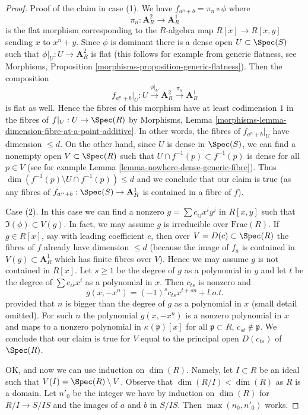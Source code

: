 \begin{proof}
\medskip\noindent
Proof of the claim in case (1). We have $f_{a^n + b} = \pi_n \circ \phi$
where
$$
\pi_n :  \mathbf{A}^2_R \to \mathbf{A}^1_R
$$
is the flat morphism corresponding to the $R$-algebra map $R[x] \to R[x, y]$
sending $x$ to $x^n + y$. Since $\phi$ is dominant there is a dense open
$U \subset \Spec(S)$ such that $\phi|_U : U \to \mathbf{A}^2_R$ is flat
(this follows for example from generic flatness, see
Morphisms, Proposition \ref{morphisms-proposition-generic-flatness}).
Then the composition
$$
f_{a^n + b}|_U :
U \xrightarrow{\phi|_U}
\mathbf{A}^2_R
\xrightarrow{\pi_n}
\mathbf{A}^1_R
$$
is flat as well. Hence the fibres of this morphism have at least
codimension $1$ in the fibres of $f|_U : U \to \Spec(R)$ by
Morphisms, Lemma \ref{morphisms-lemma-dimension-fibre-at-a-point-additive}.
In other words, the fibres of $f_{a^n + b}|_U$ have dimension $\leq d$.
On the other hand, since $U$ is dense in $\Spec(S)$, we can find a nonempty
open $V \subset \Spec(R)$ such that $U \cap f^{-1}(p) \subset f^{-1}(p)$
is dense for all $p \in V$ (see for example Lemma
\ref{lemma-nowhere-dense-generic-fibre}).
Thus $\dim(f^{-1}(p) \setminus U \cap f^{-1}(p)) \leq d$ and
we conclude that our claim is true (as any fibres of
$f_{a^n + b} : \Spec(S) \to \mathbf{A}^1_R$
is contained in a fibre of $f$).

\medskip\noindent
Case (2). In this case we can find a nonzero $g = \sum c_{ij} x^i y^j$
in $R[x, y]$ such that $\Im(\phi) \subset V(g)$. In fact, we may assume
$g$ is irreducible over $\text{Frac}(R)$. If $g \in R[x]$, say with leading
coefficient $c$, then over $V = D(c) \subset \Spec(R)$ the fibres of
$f$ already have dimension $\leq d$ (because the image of $f_a$ is contained
in $V(g) \subset \mathbf{A}^1_R$ which has finite fibres over $V$). Hence
we may assume $g$ is not contained in $R[x]$.
Let $s \geq 1$ be the degree of $g$ as a polynomial in $y$ and
let $t$ be the degree of $\sum c_{is} x^i$ as a polynomial in $x$.
Then $c_{ts}$ is nonzero and
$$
g(x, -x^n) = (-1)^s c_{ts} x^{t + sn} + l.o.t.
$$
provided that $n$ is bigger than the degree of $g$ as a polynomial in $x$
(small detail omitted). For such $n$ the polynomial $g(x, -x^n)$ 
is a nonzero polynomial in $x$ and maps to a nonzero polynomial in
$\kappa(\mathfrak p)[x]$ for all $\mathfrak p \subset R$,
$c_{st} \not \in \mathfrak p$. We conclude that our claim is
true for $V$ equal to the principal open $D(c_{ts})$ of $\Spec(R)$.

\medskip\noindent
OK, and now we can use induction on $\dim(R)$. Namely, let
$I \subset R$ be an ideal such that $V(I) = \Spec(R) \setminus V$.
Observe that $\dim(R/I) < \dim(R)$ as $R$ is a domain.
Let $n'_0$ be the integer we have by induction on $\dim(R)$
for $R/I \to S/IS$ and the images of $a$ and $b$ in $S/IS$.
Then $\max(n_0, n'_0)$ works.
\end{proof}

